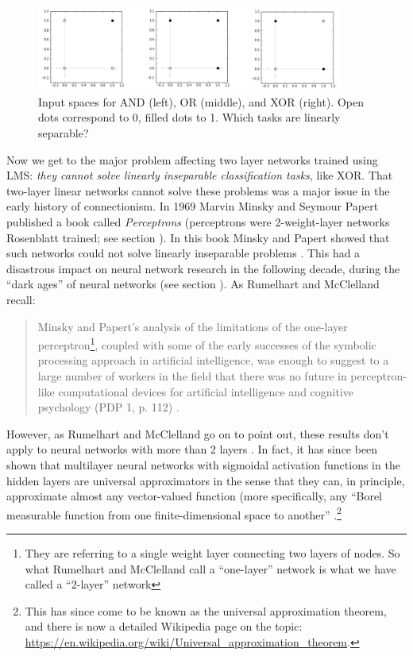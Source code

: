 \begin{figure}[h]
\centering
\includegraphics[width=0.9\textwidth]{images/booleanInputSpaces.png}
\caption[Jeff Yoshimi.]{Input spaces for AND (left), OR (middle), and XOR (right). Open dots correspond to 0, filled dots to 1. Which tasks are linearly separable?}
\label{boolean_inputspace}
\end{figure}

Now we get to the major problem affecting two layer networks trained using LMS: \emph{they cannot solve linearly inseparable classification tasks}, like XOR. That two-layer linear networks cannot solve these problems was a major issue in the early history of connectionism. In 1969 Marvin Minsky and Seymour Papert published a book called {\em Perceptrons} (perceptrons were 2-weight-layer networks Rosenblatt trained; see section ). In this book Minsky and Papert showed that such networks could not solve linearly inseparable problems \cite{minsky1969perceptrons}. This had a disastrous impact on neural network research in the following decade, during the ``dark ages'' of neural networks (see section ). As Rumelhart and McClelland recall:

\begin{quote}
Minsky and Papert's analysis of the limitations of the one-layer perceptron\footnote{They are referring to a single weight layer connecting two layers of nodes. So what Rumelhart and McClelland call a ``one-layer'' network is what we have called a ``2-layer'' network}, coupled with some of the early successes of the symbolic processing approach in artificial intelligence, was enough to suggest to a large number of workers in the field that there was no future in perceptron-like computational devices for artificial intelligence and cognitive psychology (PDP 1, p. 112) \cite{rumelhart1986parallel}.
\end{quote}

However, as Rumelhart and McClelland go on to point out, these results don't apply to neural networks with more than 2 layers \cite{rumelhart1986parallel}. In fact, it has since been shown that multilayer neural networks with sigmoidal activation functions in the hidden layers are universal approximators in the sense that they can, in principle, approximate almost any vector-valued function (more specifically, any ``Borel measurable function from one finite-dimensional space to another'' \cite{hornik1989multilayer}.\footnote{This has since come to be known as the universal approximation theorem, and there is now a detailed Wikipedia page on the topic: \url{https://en.wikipedia.org/wiki/Universal_approximation_theorem}.}

